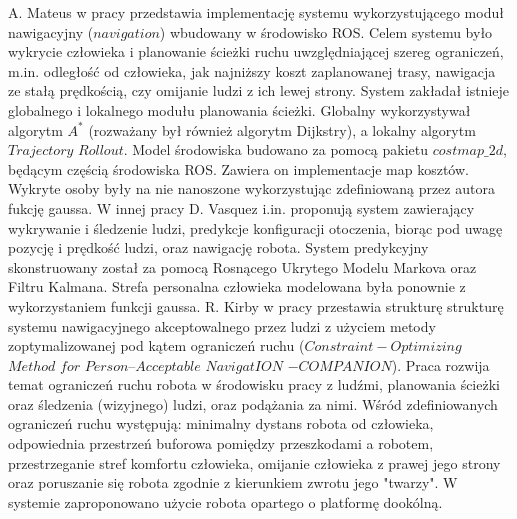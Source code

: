 A. Mateus w pracy \cite{nrs} przedstawia implementację systemu wykorzystującego moduł nawigacyjny ($navigation$) wbudowany w środowisko ROS. Celem systemu było wykrycie człowieka i planowanie ścieżki ruchu uwzględniającej szereg ograniczeń, m.in. odległość od człowieka, jak najniższy koszt zaplanowanej trasy, nawigacja ze stałą prędkością, czy omijanie ludzi z ich lewej strony. System zakładał istnieje globalnego i lokalnego modułu planowania ścieżki. Globalny wykorzystywał algorytm $A^*$ (rozważany był również algorytm Dijkstry), a lokalny algorytm $Trajectory$ $Rollout$. Model środowiska budowano za pomocą pakietu $costmap\_2d$, będącym częścią środowiska ROS. Zawiera on implementacje map kosztów. Wykryte osoby były na nie nanoszone wykorzystując zdefiniowaną przez autora fukcję gaussa. W innej pracy \cite{gauss_2} D. Vasquez i.in. proponują system zawierający wykrywanie i śledzenie ludzi, predykcje konfiguracji otoczenia, biorąc pod uwagę pozycję i prędkość ludzi, oraz nawigację robota. System predykcyjny skonstruowany został za pomocą Rosnącego Ukrytego Modelu Markova \cite{markov} oraz Filtru Kalmana. Strefa personalna człowieka modelowana była ponownie z wykorzystaniem funkcji gaussa. R. Kirby w pracy \cite{survey_3} przestawia strukturę strukturę systemu nawigacyjnego akceptowalnego przez ludzi z użyciem metody zoptymalizowanej pod kątem ograniczeń ruchu ($Constraint-Optimizing$
$Method$ $for$ $Person–Acceptable$ $NavigatION$ $- COMPANION$). Praca rozwija temat ograniczeń ruchu robota w środowisku pracy z ludźmi, planowania ścieżki oraz śledzenia (wizyjnego) ludzi, oraz podążania za nimi. Wśród zdefiniowanych ograniczeń ruchu występują: minimalny dystans robota od człowieka, odpowiednia przestrzeń buforowa pomiędzy przeszkodami a robotem, przestrzeganie stref komfortu człowieka, omijanie człowieka z prawej jego strony oraz poruszanie się robota zgodnie z kierunkiem zwrotu jego "twarzy". W systemie zaproponowano użycie robota opartego o platformę dookólną.
    
    
